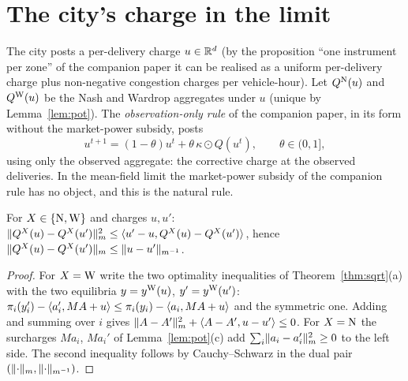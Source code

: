 \section{The city's charge in the limit}\label{sec:leader}

The city posts a per-delivery charge $u\in\mathbb{R}^d$ (by the proposition ``one instrument per zone'' of the companion paper it can be realised as a uniform per-delivery charge plus non-negative congestion charges per vehicle-hour). Let $Q^{\mathrm{N}}(u)$ and $Q^{\mathrm{W}}(u)$ be the Nash and Wardrop aggregates under $u$ (unique by Lemma~\ref{lem:pot}). The \emph{observation-only rule} of the companion paper, in its form without the market-power subsidy, posts
\[
u^{t+1}=(1-\theta)u^t+\theta\,\kappa\odot Q(u^t),\qquad\theta\in(0,1],
\]
using only the observed aggregate: the corrective charge at the observed deliveries. In the mean-field limit the market-power subsidy of the companion rule has no object, and this is the natural rule.

\begin{lemma}\label{lem:prox}
For $X\in\{\mathrm{N},\mathrm{W}\}$ and charges $u,u'$: $\lVert Q^X(u)-Q^X(u')\rVert_m^2\le\langle u'-u,Q^X(u)-Q^X(u')\rangle$, hence $\lVert Q^X(u)-Q^X(u')\rVert_m\le\lVert u-u'\rVert_{m^{-1}}$.
\end{lemma}
\begin{proof}
For $X=\mathrm{W}$ write the two optimality inequalities of Theorem~\ref{thm:sqrt}(a) with the two equilibria $y=y^{\mathrm{W}}(u)$, $y'=y^{\mathrm{W}}(u')$: $\pi_i(y_i')-\langle a_i',MA+u\rangle\le\pi_i(y_i)-\langle a_i,MA+u\rangle$ and the symmetric one. Adding and summing over $i$ gives $\lVert A-A'\rVert_m^2+\langle A-A',u-u'\rangle\le0$. For $X=\mathrm{N}$ the surcharges $Ma_i$, $Ma_i'$ of Lemma~\ref{lem:pot}(c) add $\sum_i\lVert a_i-a_i'\rVert_m^2\ge0$ to the left side. The second inequality follows by Cauchy--Schwarz in the dual pair $(\lVert \cdot\rVert_m,\lVert \cdot\rVert_{m^{-1}})$.
\end{proof}

